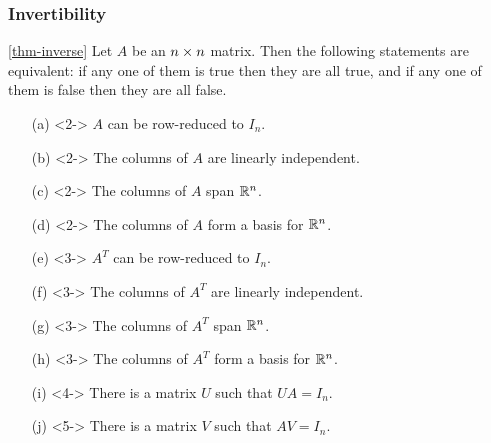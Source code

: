 \documentclass[9pt]{beamer}
\begin{document}
\begin{frame}[t]
 \frametitle{Invertibility}
 
 \begin{theorem*}{\ref{thm-inverse}}
  Let $A$ be an $n\times n$ matrix.  Then the following statements are
  equivalent: if any one of them is true then they are all true, and if
  any one of them is false then they are all false.
  \begin{itemize}
   \item[(a)]<2-> $A$ can be row-reduced to $I_n$.
   \item[(b)]<2-> The columns of $A$ are linearly independent.
   \item[(c)]<2-> The columns of $A$ span ${\mathbb{R}}^n$.
   \item[(d)]<2-> The columns of $A$ form a basis for ${\mathbb{R}}^n$.
   \item[(e)]<3-> $A^T$ can be row-reduced to $I_n$.
   \item[(f)]<3-> The columns of $A^T$ are linearly independent.
   \item[(g)]<3-> The columns of $A^T$ span ${\mathbb{R}}^n$.
   \item[(h)]<3-> The columns of $A^T$ form a basis for ${\mathbb{R}}^n$.
   \item[(i)]<4-> There is a matrix $U$ such that $UA=I_n$.
   \item[(j)]<5-> There is a matrix $V$ such that $AV=I_n$.
  \end{itemize}
 \end{theorem*}
\end{frame}
\end{document}
